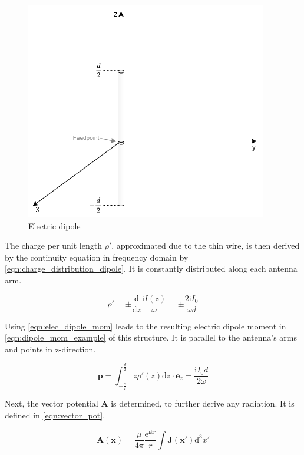 
\begin{figure}[h]
    \centering
    \includegraphics[width=0.5\linewidth]{Documentation//images/electric_dipole_drawing.png}
    \caption{Electric dipole}
    \label{fig:electric_dipole}
\end{figure}

The charge per unit length $\rho'$, approximated due to the thin wire, is then derived by the continuity equation in frequency domain by \autoref{eqn:charge_distribution_dipole}. It is constantly distributed along each antenna arm\cite{Griffiths_2024}\cite{Jackson}.

\begin{equation}
    \rho' = \pm\frac{\mathrm{d}}{\mathrm{d}z}\frac{\mathrm{i}I(z)}{\omega} = \pm\frac{2\mathrm{i}I_0}{\omega d}
    \label{eqn:charge_distribution_dipole}
\end{equation}

Using \autoref{eqn:elec_dipole_mom} leads to the resulting electric dipole moment in \autoref{eqn:dipole_mom_example} of this structure. It is parallel to the antenna's arms and points in z-direction\cite{Griffiths_2024}\cite{Jackson}. 

\begin{equation}
    \mathbf{p}=\int_{-\frac{d}{2}}^{\frac{d}{2}}z\rho'(z)\mathrm{d}z\cdot\mathbf{e}_z = \frac{\mathrm{i}I_0d}{2\omega}
    \label{eqn:dipole_mom_example}
\end{equation}

Next, the vector potential $\mathbf{A}$ is determined, to further derive any radiation. It is defined in \autoref{eqn:vector_pot}\cite{Balanis_1997}\cite{Jackson}. %

\begin{equation}
    \mathbf{A}(\mathbf{x})=\frac{\mu}{4\pi}\frac{\mathrm{e}^{\mathrm{i}kr}}{r}\int \mathbf{J}(\mathbf{x'})\mathrm{d}^3x'
    \label{eqn:vector_pot}
\end{equation}

